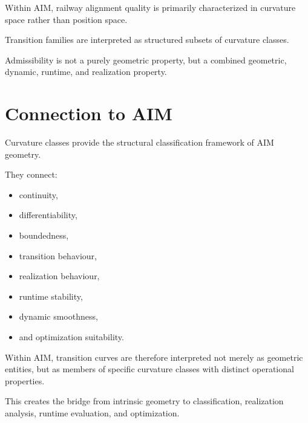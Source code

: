 \begin{proposition}
Within AIM, railway alignment quality is primarily characterized in
curvature space rather than position space.
\end{proposition}

\begin{proposition}
Transition families are interpreted as structured subsets of curvature
classes.
\end{proposition}

\begin{proposition}
Admissibility is not a purely geometric property, but a combined
geometric, dynamic, runtime, and realization property.
\end{proposition}

\section{Connection to AIM}

\begin{summary}
Curvature classes provide the structural classification framework of AIM
geometry.

They connect:
\begin{itemize}
\item continuity,
\item differentiability,
\item boundedness,
\item transition behaviour,
\item realization behaviour,
\item runtime stability,
\item dynamic smoothness,
\item and optimization suitability.
\end{itemize}

Within AIM, transition curves are therefore interpreted not merely as
geometric entities, but as members of specific curvature classes with
distinct operational properties.

This creates the bridge from intrinsic geometry to classification,
realization analysis, runtime evaluation, and optimization.
\end{summary}

